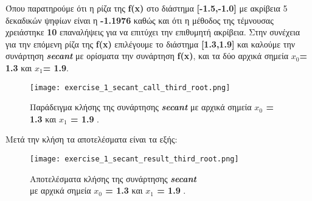 \documentclass[First Project.tex]{subfiles}
\begin{document}
Όπου παρατηρούμε ότι η ρίζα της \textlatin{\textbf{f(x)}} στο διάστημα \textlatin{\textbf{[-1.5,-1.0]}} με ακρίβεια 5 δεκαδικών ψηφίων 
είναι η \textbf{-1.1976} καθώς και ότι η μέθοδος της τέμνουσας χρειάστηκε \textbf{10} επαναλήψεις για να επιτύχει την 
επιθυμητή ακρίβεια. Στην συνέχεια για την επόμενη ρίζα της \textlatin{\textbf{f(x)}} επιλέγουμε το διάστημα \textlatin{\textbf{[1.3,1.9]}} και
καλούμε την συνάρτηση \textit{\textlatin{\textbf{secant}}} με ορίσματα την συνάρτηση \textlatin{\textbf{f(x)}}, και τα δύο αρχικά σημεία 
\textlatin{\textbf{$x_{0}$= 1.3}} και \textlatin{\textbf{$x_{1}$= 1.9}}.
\vspace{5px}
\begin{figure}[h!]
    \centering
    \captionsetup{justification=centering}
    \begin{center}
        \texttt{[image: exercise\_1\_secant\_call\_third\_root.png]}    
        \caption{ Παράδειγμα κλήσης της συνάρτησης \textit{\textlatin{\textbf{secant}}} με αρχικά σημεία \textbf{\textlatin{$x_{0}$ = 1.3}} 
                    και \textbf{\textlatin{$x_{1}$ = 1.9}} .}
    \end{center}
\end{figure}


Μετά την κλήση τα αποτελέσματα είναι τα εξής:
\vspace{5px}
\begin{figure}[h!]
    \centering
    \captionsetup{justification=centering}
    \begin{center}
    \texttt{[image: exercise\_1\_secant\_result\_third\_root.png]}    
    \caption{ Αποτελέσματα κλήσης της συνάρτησης \textit{\textlatin{\textbf{secant}}} \\ με αρχικά σημεία \textbf{\textlatin{$x_{0}$ = 1.3}} 
                και \textbf{\textlatin{$x_{1}$ = 1.9}} . }
    \end{center}
\end{figure}
\end{document}
